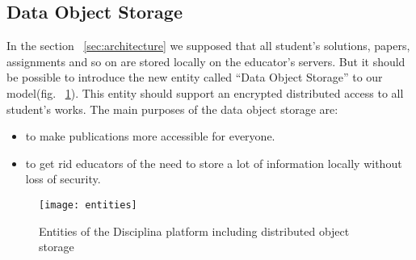 \subsection{Data Object Storage}
\label{apx:data-object-storage}

In the section ~\ref{sec:architecture} we supposed that all student's solutions,
papers, assignments and so on are stored locally on the educator's servers. But
it should be possible to introduce the new entity called ``Data Object Storage''
to our model(fig. ~\ref{fig:entities-object-storage}). This entity should support
an encrypted distributed access to all student's works. The main purposes of the
data object storage are:

\begin{itemize}
\item to make publications more accessible for everyone.
\item to get rid educators of the need to store a lot of information locally without loss of security.
\end{itemize}

\begin{figure}[ht]
\centering
\texttt{[image: entities]}
\caption{Entities of the Disciplina platform including distributed object storage}
\label{fig:entities-object-storage}
\end{figure}

